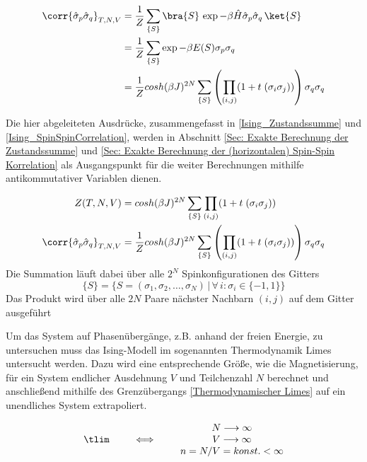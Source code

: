 \begin{align} 
    \corr{\hat{\sigma}_{p} \hat{\sigma}_{q} }_{T,N,V}  
    & = \frac{1}{Z} \sum_{\{S\}} \bra{S}\,\exp{-\beta \hat{H}} \hat{\sigma}_{p} \hat{\sigma}_{q} \,\ket{S} \\
    & = \frac{1}{Z} \sum_{\{S\}} \exp{-\beta E( S ) } \sigma_{p} \sigma_{q} \\
    & = \frac{1}{Z} cosh(\beta J)^{2N} \sum_{\{S\}} \left(\prod_{(i,j)} (1 +  t \; (\sigma_i \sigma_j) )\right) \sigma_{q} \sigma_{q} 
\end{align}

\noindent Die hier abgeleiteten Ausdrücke, zusammengefasst in  \eqref{Ising_Zustandssumme} und \eqref{Ising_SpinSpinCorrelation}, werden in Abschnitt \ref{Sec: Exakte Berechnung der Zustandssumme} und \ref{Sec: Exakte Berechnung der (horizontalen) Spin-Spin Korrelation} als Ausgangspunkt für die weiter Berechnungen mithilfe antikommutativer Variablen dienen.

\begin{grayframe}[frametitle = {Zustandssumme und Spin-Spin-Korrelation für 2d Ising-Modell}]
\begin{align}
 Z(T,N,V)  
  & = cosh(\beta J)^{2N} \sum_{\{S\}} \prod_{(i,j)} (1 +  t \; (\sigma_i \sigma_j)) \label{Ising_Zustandssumme} \\
\corr{\hat{\sigma}_{p} \hat{\sigma}_{q} }_{T,N,V} 
  & = \frac{1}{Z} cosh(\beta J)^{2N} \sum_{\{S\}} \left(\prod_{(i,j)} (1 +  t \; (\sigma_i \sigma_j) )\right) \sigma_{q} \sigma_{q} \label{Ising_SpinSpinCorrelation}
\end{align}
\centering
\noindent Die Summation läuft dabei über alle $2^N$ Spinkonfigurationen des Gitters
$$\{S\} = \{S = (\sigma_1, \sigma_2, \dots,\sigma_N) \,\vert\, \forall\,i : \sigma_i \in \{-1, 1\}\}$$
Das Produkt wird über alle $2N$ Paare nächster Nachbarn $(i,j)$ auf dem Gitter ausgeführt
\end{grayframe}

\noindent Um das System auf Phasenübergänge, z.B. anhand der freien Energie, zu untersuchen muss das Ising-Modell im sogenannten Thermodynamik Limes untersucht werden. Dazu wird eine entsprechende Größe, wie die Magnetisierung, für ein System endlicher Ausdehnung $V$ und Teilchenzahl $N$ berechnet und anschließend mithilfe des Grenzübergangs \eqref{Thermodynamischer Limes} auf ein unendliches System extrapoliert. 

\begin{equation} \label{Thermodynamischer Limes}
\centering
\begin{tabular}{lccccc}
        &  &                 &    &      $N \longrightarrow \infty$\\
$\tlim$ &  &  $\iff$           &   &      $V \longrightarrow \infty$ \\
        &  &                 &   & $n =  N/V = konst. < \infty$
\end{tabular}
\end{equation}

